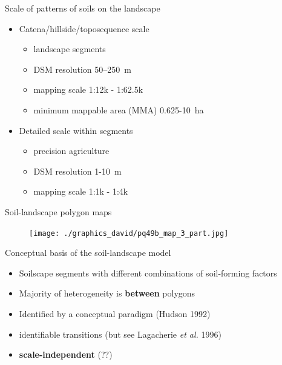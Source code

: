 \documentclass[aspectratio=169]{beamer}
\begin{document}
\begin{frame}{Scale of patterns of soils on the landscape}
\begin{itemize}
    \item Catena/hillside/toposequence scale
    \begin{itemize}
        \item landscape segments
        \item DSM resolution 50--250~m
        \item mapping scale 1:12k - 1:62.5k
        \item minimum mappable area (MMA) 0.625-10~ha
        \end{itemize}
    \item Detailed scale within segments
    \begin{itemize}
        \item precision agriculture
        \item DSM resolution 1-10~m
        \item mapping scale 1:1k - 1:4k
    \end{itemize}
\end{itemize}
\end{frame}

\begin{frame}{Soil-landscape polygon maps}
\begin{figure}
    \centering    \texttt{[image: ./graphics\_david/pq49b\_map\_3\_part.jpg]}
\end{figure}  
\end{frame}

\begin{frame}{Conceptual basis of the soil-landscape model}
    \begin{itemize}
        \item Soilscape segments with different combinations of soil-forming factors
        \item Majority of heterogeneity is \textbf{between} polygons
        \item Identified by a conceptual paradigm (Hudson 1992)
        \item identifiable transitions (but see Lagacherie \textit{et al.} 1996)
        \item \textbf{scale-independent} (??)
    \end{itemize}
\end{frame}
\end{document}
